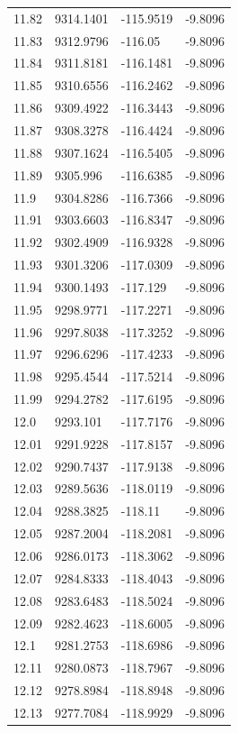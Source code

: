 \begin{table}[H]
\begin{tabular}{llll}
11.82 & 9314.1401 & -115.9519 & -9.8096 \\
11.83 & 9312.9796 & -116.05 & -9.8096 \\
11.84 & 9311.8181 & -116.1481 & -9.8096 \\
11.85 & 9310.6556 & -116.2462 & -9.8096 \\
11.86 & 9309.4922 & -116.3443 & -9.8096 \\
11.87 & 9308.3278 & -116.4424 & -9.8096 \\
11.88 & 9307.1624 & -116.5405 & -9.8096 \\
11.89 & 9305.996 & -116.6385 & -9.8096 \\
11.9 & 9304.8286 & -116.7366 & -9.8096 \\
11.91 & 9303.6603 & -116.8347 & -9.8096 \\
11.92 & 9302.4909 & -116.9328 & -9.8096 \\
11.93 & 9301.3206 & -117.0309 & -9.8096 \\
11.94 & 9300.1493 & -117.129 & -9.8096 \\
11.95 & 9298.9771 & -117.2271 & -9.8096 \\
11.96 & 9297.8038 & -117.3252 & -9.8096 \\
11.97 & 9296.6296 & -117.4233 & -9.8096 \\
11.98 & 9295.4544 & -117.5214 & -9.8096 \\
11.99 & 9294.2782 & -117.6195 & -9.8096 \\
12.0 & 9293.101 & -117.7176 & -9.8096 \\
12.01 & 9291.9228 & -117.8157 & -9.8096 \\
12.02 & 9290.7437 & -117.9138 & -9.8096 \\
12.03 & 9289.5636 & -118.0119 & -9.8096 \\
12.04 & 9288.3825 & -118.11 & -9.8096 \\
12.05 & 9287.2004 & -118.2081 & -9.8096 \\
12.06 & 9286.0173 & -118.3062 & -9.8096 \\
12.07 & 9284.8333 & -118.4043 & -9.8096 \\
12.08 & 9283.6483 & -118.5024 & -9.8096 \\
12.09 & 9282.4623 & -118.6005 & -9.8096 \\
12.1 & 9281.2753 & -118.6986 & -9.8096 \\
12.11 & 9280.0873 & -118.7967 & -9.8096 \\
12.12 & 9278.8984 & -118.8948 & -9.8096 \\
12.13 & 9277.7084 & -118.9929 & -9.8096 \\

\end{tabular}
\end{table}
